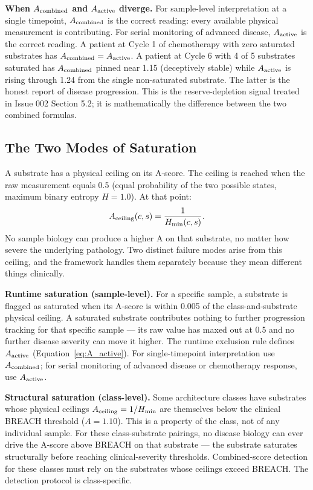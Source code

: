\documentclass[12pt,a4paper]{article}
\begin{document}
\textbf{When $A_{\rm combined}$ and $A_{\rm active}$ diverge.} For sample-level
interpretation at a single timepoint, $A_{\rm combined}$ is the correct reading:
every available physical measurement is contributing. For serial monitoring of
advanced disease, $A_{\rm active}$ is the correct reading. A patient at
Cycle 1 of chemotherapy with zero saturated substrates has $A_{\rm combined} =
A_{\rm active}$. A patient at Cycle 6 with 4 of 5 substrates saturated has
$A_{\rm combined}$ pinned near 1.15 (deceptively stable) while $A_{\rm active}$
is rising through 1.24 from the single non-saturated substrate. The latter is
the honest report of disease progression. This is the reserve-depletion
signal treated in Issue 002 Section 5.2; it is mathematically the difference
between the two combined formulas.

\subsection{The Two Modes of Saturation}
\label{subsec:saturation}

A substrate has a physical ceiling on its A-score. The ceiling is reached
when the raw measurement equals 0.5 (equal probability of the two possible
states, maximum binary entropy $H = 1.0$). At that point:
\begin{equation}
A_{\rm ceiling}(c,s) = \frac{1}{H_{\rm min}(c,s)}.
\label{eq:ceiling}
\end{equation}
No sample biology can produce a higher A on that substrate, no matter how
severe the underlying pathology. Two distinct failure modes arise from this
ceiling, and the framework handles them separately because they mean different
things clinically.

\textbf{Runtime saturation (sample-level).}
For a specific sample, a substrate is flagged as saturated when its A-score
is within 0.005 of the class-and-substrate physical ceiling. A saturated
substrate contributes nothing to further progression tracking for that
specific sample --- its raw value has maxed out at 0.5 and no further disease
severity can move it higher. The runtime exclusion rule defines
$A_{\rm active}$ (Equation~\ref{eq:A_active}). For single-timepoint
interpretation use $A_{\rm combined}$; for serial monitoring of advanced
disease or chemotherapy response, use $A_{\rm active}$.

\textbf{Structural saturation (class-level).}
Some architecture classes have substrates whose physical ceilings
$A_{\rm ceiling} = 1/H_{\rm min}$ are themselves below the clinical BREACH
threshold ($A = 1.10$). This is a property of the class, not of any individual
sample. For these class-substrate pairings, no disease biology can ever drive
the A-score above BREACH on that substrate --- the substrate saturates
structurally before reaching clinical-severity thresholds. Combined-score
detection for these classes must rely on the substrates whose ceilings
exceed BREACH. The detection protocol is class-specific.
\end{document}
